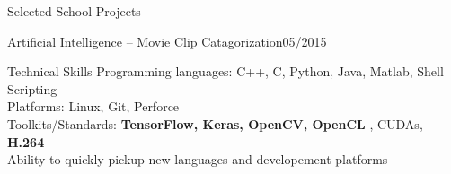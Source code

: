 \documentclass{resume} %
\begin{document}
\begin{rSection}{Selected School Projects}
\begin{rSubsection}{Artificial Intelligence -- Movie Clip Catagorization}{05/2015}{}{}
\end{rSubsection}

\end{rSection}









\begin{rSection}{Technical Skills}
Programming languages: C++, C, Python, Java, Matlab, Shell Scripting\\
Platforms: Linux, Git, Perforce\\
Toolkits/Standards: {\bf TensorFlow, Keras, OpenCV, OpenCL }, CUDAs, {\bf H.264}\\
Ability to quickly pickup new languages and developement platforms\\

\end{rSection}





\end{document}
